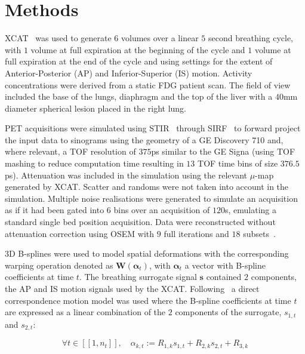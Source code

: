 \documentclass{IEEEtran}
\begin{document}
\vspace{-0.2cm}

\section*{Methods}
XCAT~\cite{Segars2010} was used to generate $6$ volumes over a linear $5$ second breathing cycle, with $1$ volume at full expiration at the beginning of the cycle and $1$ volume at full expiration at the end of the cycle and using settings for the extent of Anterior-Posterior (AP) and Inferior-Superior (IS) motion. Activity concentrations were derived from a static FDG patient scan. The field of view included the base of the lungs, diaphragm and the top of the liver with a $40$mm diameter spherical lesion placed in the right lung.

PET acquisitions were simulated using STIR~\cite{Thielemans2012,Efthimiou2018} through SIRF~\cite{Ovtchinnikov2017} to forward project the input data to sinograms using the geometry of a GE Discovery 710 and, where relevant, a TOF resolution of $375$ps similar to the GE Signa (using TOF mashing to reduce computation time resulting in $13$ TOF time bins of size $376.5$ps). Attenuation was included in the simulation using the relevant $\mu$-map generated by XCAT. Scatter and randoms were not taken into account in the simulation. Multiple noise realisations were generated to simulate an acquisition as if it had been gated into $6$ bins over an acquisition of $120$s, emulating a standard single bed position acquisition. Data were reconstructed without attenuation correction using OSEM with $9$ full iterations and $18$ subsets~\cite{Hudson1994}. 

3D B-splines were used to model spatial deformations with the corresponding warping operation denoted as $\mathbf{W}(\mathbf{\alpha}_t)$, with $\mathbf{\alpha}_t$ a vector with B-spline coefficients at time $t$. The breathing surrogate signal $\mathbf{s}$ contained $2$ components, the AP and IS motion signals used by the XCAT.  Following~\cite{McClelland2013} a direct correspondence motion model was used where the B-spline coefficients at time $t$ are expressed as a linear combination of the $2$ components of the surrogate, $s_{1,t}$ and $s_{2,t}$:

\vspace{-0.2cm}

\begin{equation}
    \forall t \in [[1,n_t]],\quad \alpha_{k,t} := R_{1,k} s_{1,t} + R_{2,k} s_{2,t} + R_{3,k}
\end{equation}
\end{document}
